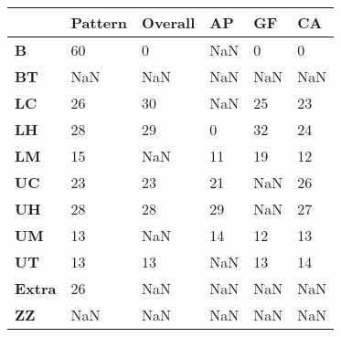 \begin{tabular}{|l|l|l|l|l|l|}
\hline
&\textbf{Pattern}&\textbf{Overall}&\textbf{AP}&\textbf{GF}&\textbf{CA}\\\hline
\textbf{B}&60&0&NaN&0&0\\\hline
\textbf{BT}&NaN&NaN&NaN&NaN&NaN\\\hline
\textbf{LC}&26&30&NaN&25&23\\\hline
\textbf{LH}&28&29&0&32&24\\\hline
\textbf{LM}&15&NaN&11&19&12\\\hline
\textbf{UC}&23&23&21&NaN&26\\\hline
\textbf{UH}&28&28&29&NaN&27\\\hline
\textbf{UM}&13&NaN&14&12&13\\\hline
\textbf{UT}&13&13&NaN&13&14\\\hline
\textbf{Extra}&26&NaN&NaN&NaN&NaN\\\hline
\textbf{ZZ}&NaN&NaN&NaN&NaN&NaN\\\hline
\end{tabular}
